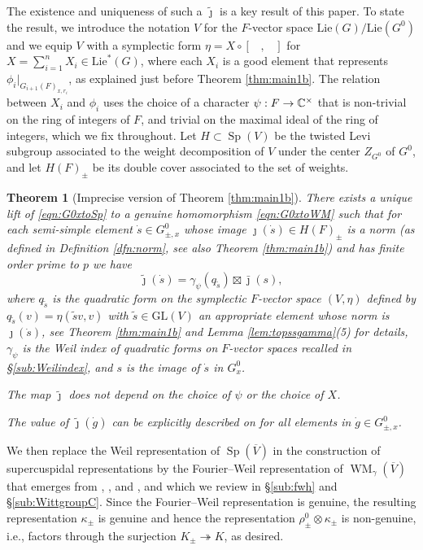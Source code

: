 \documentclass{article}
\def\ol#1{\overline{#1}}
\newcommand{\bC}{\mathbb{C}}
\DeclareMathOperator{\Sp}{Sp}
\newtheorem{thm}{Theorem}[subsection]
\theoremstyle{definition}
\numberwithin{equation}{subsection}
\renewcommand{\-}{\hyp{}}
\DeclareMathOperator{\WM}{WM}
\begin{document}
The existence and uniqueness of such a $\tilde \jmath$ is a key result of this paper. To state the result, we introduce the notation $V$ for the $F$-vector space $\mathrm{Lie}(G)/\mathrm{Lie}(G^0)$ and we equip $V$ with a symplectic form $\eta = X \circ [\phantom{X},\phantom{X}]$ for $X=\sum_{i=1}^n X_i \in \mathrm{Lie}^*(G)$, where each $X_i$ is a good element that represents $\phi_i|_{G_{i+1}(F)_{x,r_i}}$, as explained just before Theorem \ref{thm:main1b}. The relation between $X_i$ and $\phi_i$ uses the choice of a character $\psi: F \ra \bC^\times$ that is non-trivial on the ring of integers of $F$, and trivial on the maximal ideal of the ring of integers, which we fix throughout. Let $H \subset \Sp(V)$ be the twisted Levi subgroup associated to the weight decomposition of $V$ under the center $Z_{G^0}$ of $G^0$, and let $H(F)_\pm$ be its double cover associated to the set of weights.

\begin{thm}[Imprecise version of Theorem \ref{thm:main1b}]
	There exists a unique lift of \eqref{eqn:G0xtoSp} to a genuine homomorphism \eqref{eqn:G0xtoWM} such that for each semi-simple element $\dot s \in G^0_{\pm,x}$ whose image $\jmath(\dot s) \in H(F)_\pm$ is a norm (as defined in Definition  \ref{dfn:norm}, see also Theorem \ref{thm:main1b}) and has finite order prime to $p$ we have
	\[ \tilde\jmath(\dot s)=\gamma_\psi(q_{\tilde s})\boxtimes \bar\jmath(s), \] 
	where $q_{\tilde s}$ is the quadratic form on the symplectic $F$-vector space $(V,\eta)$ defined by $q_{\tilde s}(v)=\eta(\tilde sv,v)$ with $\tilde s \in \mathrm{GL}(V)$ an appropriate element whose norm is $\jmath(\dot s)$, see Theorem \ref{thm:main1b} and Lemma \ref{lem:topssgamma}(5) for details, $\gamma_\psi$ is the Weil index of quadratic forms on $F$-vector spaces recalled in \S\ref{sub:Weilindex}, and $s$ is the image of $\dot s$ in $G^0_x$. 
	
	The map $\tilde \jmath$ does not depend on the choice of $\psi$ or the choice of $X$.
	
	The value of $\tilde \jmath(\dot g)$ can be explicitly described on for all elements in $\dot g \in  G^0_{\pm,x}$.
\end{thm}







We then replace the Weil representation of $\Sp(\ol{V})$ in the construction of supercuspidal representations by the Fourier--Weil representation of $\WM_\gamma(\ol{V})$ that emerges from \cite{LionVergne}, \cite{RR93}, and \cite{Thomas2013}, and which we review in \S\ref{sub:fwh} and \S\ref{sub:WittgroupC}. Since the Fourier--Weil representation is genuine, the resulting representation $\kappa_{\pm}$ is genuine and hence the representation $\rho^0_{\pm} \otimes \kappa_{\pm}$ is non-genuine, i.e., factors through the surjection $K_{\pm} \twoheadrightarrow K$, as desired. 
\end{document}
